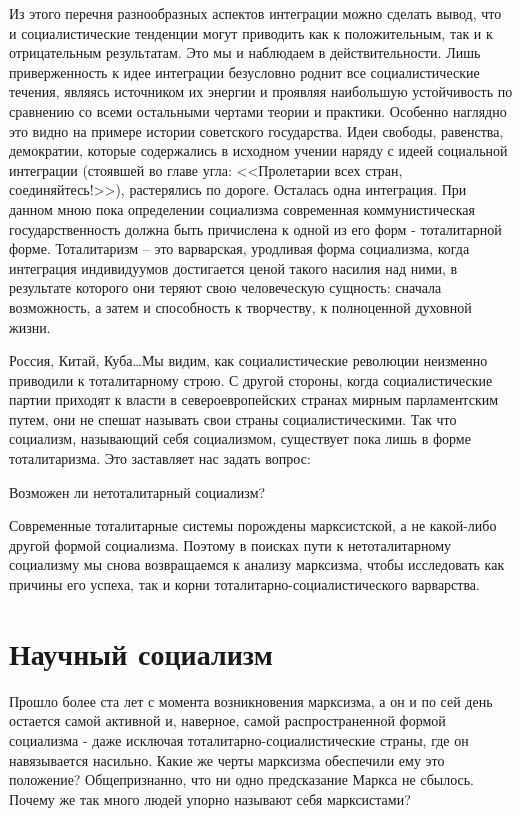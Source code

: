 \documentclass{book}
\begin{document}
Из этого перечня разнообразных аспектов интеграции можно сделать вывод, что и социалистические тенденции могут при­водить как к положительным, так и к отрицательным резуль­татам. Это мы и наблюдаем в действительности. Лишь привер­женность к идее интеграции безусловно роднит все социали­стические течения, являясь источником их энергии и проявляя наибольшую устойчивость по сравнению со всеми остальными чертами теории и практики. Особенно наглядно это видно на примере истории советского государства. Идеи свободы, ра­венства, демократии, которые содержались в исходном учении наряду с идеей социальной интеграции (стоявшей во главе угла: <<Пролетарии всех стран, соединяйтесь!>>), растерялись по доро­ге. Осталась одна интеграция. При данном мною пока опреде­лении социализма современная коммунистическая государст­венность должна быть причислена к одной из его форм - тота­литарной форме. Тоталитаризм -- это варварская, уродливая форма социализма, когда интеграция индивидуумов достига­ется ценой такого насилия над ними, 
в результате которого они теряют свою человеческую сущность: сначала возможность, а затем и способность к творчеству, к полноценной духовной жизни.

Россия, Китай, Куба\ldots Мы видим, как социалистические ре­волюции неизменно приводили к тоталитарному строю. С дру­гой стороны, когда социалистические партии приходят к власти в североевропейских странах мирным парламентским путем, они не спешат называть свои страны социалистическими. Так что социализм, называющий себя социализмом, существует пока лишь в форме тоталитаризма. Это заставляет нас задать вопрос:

Возможен ли нетоталитарный социализм?

Современные тоталитарные системы порождены марксистской, а не какой-либо другой формой социализма. Поэтому в поисках пути к нетоталитарному социализму мы снова возвращаемся к анализу марксизма, чтобы исследовать как причины его успеха, так и корни тоталитарно-социалистического варварства.


\section{Научный социализм}

Прошло более ста лет с момента возникновения марксизма, а он и по сей день остается самой активной и, наверное, самой распространенной формой социализма - даже исключая тота­литарно-социалистические страны, где он навязывается насиль­но. Какие же черты марксизма обеспечили ему это положение? Общепризнанно, что ни одно предсказание Маркса не сбылось. Почему же так много людей упорно называют себя маркси­стами?
\end{document}
